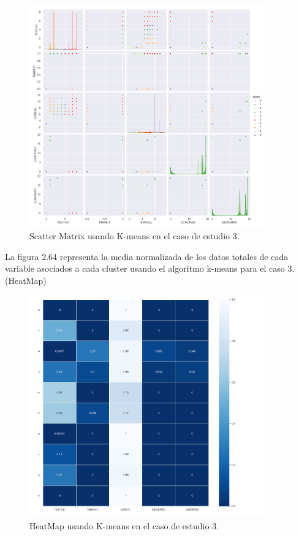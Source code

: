 	\begin{figure}[htb]
		\centering
		\includegraphics[width=0.9\textwidth]{./imagenes/caso3/scatterMatrix_caso3_K-means}
		\caption{Scatter Matrix usando K-means en el caso de estudio 3.} \label{fig:1}
	\end{figure}

	La figura 2.64 representa la media normalizada de los datos totales de cada variable asociados
	a cada cluster usando el algoritmo k-means para el caso 3. (HeatMap) \\

	\begin{figure}[htb]
		\centering
		\includegraphics[width=0.9\textwidth]{./imagenes/caso3/heatmap_caso3_K-means}
		\caption{HeatMap usando K-means en el caso de estudio 3.} \label{fig:1}
	\end{figure}

